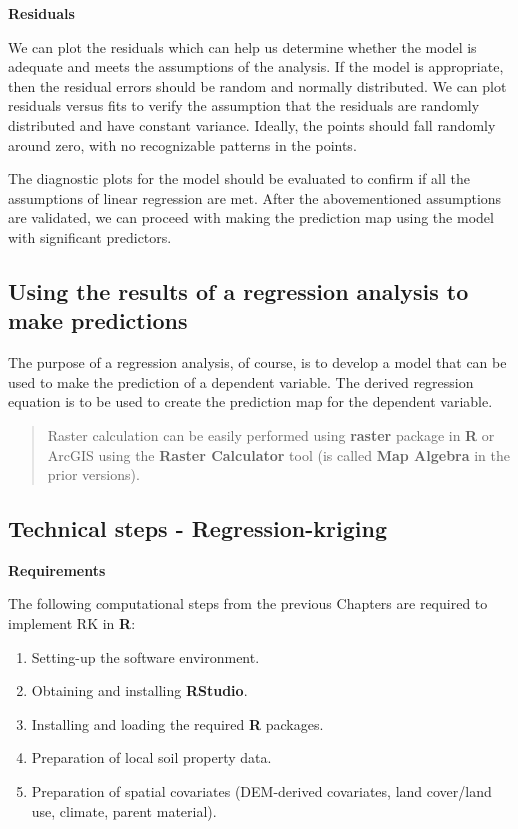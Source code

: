 \documentclass[10pt,b5paper,]{book}
\providecommand{\tightlist}{%
  \setlength{\itemsep}{0pt}\setlength{\parskip}{0pt}}
\theoremstyle{definition}
\theoremstyle{definition}
\theoremstyle{definition}
\theoremstyle{remark}
\begin{document}
\textbf{Residuals}

We can plot the residuals which can help us determine whether the model
is adequate and meets the assumptions of the analysis. If the model is
appropriate, then the residual errors should be random and normally
distributed. We can plot residuals versus fits to verify the assumption
that the residuals are randomly distributed and have constant variance.
Ideally, the points should fall randomly around zero, with no
recognizable patterns in the points.

The diagnostic plots for the model should be evaluated to confirm if all
the assumptions of linear regression are met. After the abovementioned
assumptions are validated, we can proceed with making the prediction map
using the model with significant predictors.

\hypertarget{using-the-results-of-a-regression-analysis-to-make-predictions}{%
\subsection{Using the results of a regression analysis to make
predictions}\label{using-the-results-of-a-regression-analysis-to-make-predictions}}

The purpose of a regression analysis, of course, is to develop a model
that can be used to make the prediction of a dependent variable. The
derived regression equation is to be used to create the prediction map
for the dependent variable.

\begin{quote}
Raster calculation can be easily performed using \textbf{raster} package
in \textbf{R} or ArcGIS using the \textbf{Raster Calculator} tool (is
called \textbf{Map Algebra} in the prior versions).
\end{quote}

\hypertarget{technical-steps---regression-kriging}{%
\subsection{Technical steps -
Regression-kriging}\label{technical-steps---regression-kriging}}

\textbf{Requirements}

The following computational steps from the previous Chapters are
required to implement RK in \textbf{R}:

\begin{enumerate}
\def\labelenumi{\arabic{enumi}.}
\tightlist
\item
  Setting-up the software environment.
\item
  Obtaining and installing \textbf{RStudio}.
\item
  Installing and loading the required \textbf{R} packages.
\item
  Preparation of local soil property data.
\item
  Preparation of spatial covariates (DEM-derived covariates, land
  cover/land use, climate, parent material).
\end{enumerate}
\end{document}

